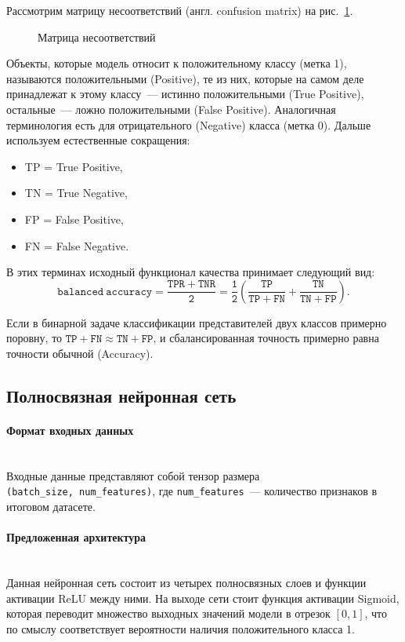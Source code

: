 Рассмотрим матрицу несоответствий (англ. confusion matrix) на рис.~\ref{conf_mtrx}.

\begin{figure}[h]
	\centering
	\hspace{-3cm}
	
	\caption{Матрица несоответствий \cite{conf_mtrx}}
	\label{conf_mtrx}
\end{figure}

Объекты, которые модель относит к положительному классу (метка 1), называются положительными (Positive), 
те из них, которые на самом деле принадлежат к этому классу~--- истинно положительными (True Positive), 
остальные~--- ложно положительными (False Positive). Аналогичная терминология есть для отрицательного (Negative) класса (метка 0). 
Дальше используем естественные сокращения:
\begin{itemize}[noitemsep, wide]
	\item TP = True Positive,
	\item TN = True Negative,
	\item FP = False Positive,
	\item FN = False Negative.
\end{itemize}

В этих терминах исходный функционал качества принимает следующий вид:
\[
		\mathtt{balanced\ accuracy = \frac{TPR+TNR}{2} = \frac{1}{2}\left(\frac{TP}{TP+FN} + \frac{TN}{TN+FP}\right)}.
\]

Если в бинарной задаче классификации представителей двух классов примерно поровну, 
то $ \mathtt{TP + FN \approx TN + FP}  $, и сбалансированная точность примерно равна точности обычной (Accuracy).

\subsection{Полносвязная нейронная сеть}

\paragraph{Формат входных данных}~\\
Входные данные представляют собой тензор размера \texttt{(batch\_size,~num\_features)}, 
где  \texttt{num\_features}~--- количество признаков в итоговом датасете.

\vspace{-2ex}
\paragraph{Предложенная архитектура}~\\
Данная нейронная сеть состоит из четырех полносвязных слоев и функции активации ReLU \cite{act_func} между ними. 
На выходе сети стоит функция активации Sigmoid, которая переводит множество выходных
значений модели в отрезок $ [0, 1] $, что по смыслу соответствует вероятности наличия положительного класса 1.

